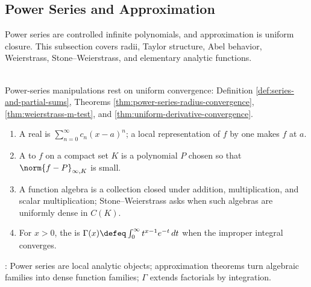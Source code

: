 \subsection{Power Series and Approximation}

%


Power series are controlled infinite polynomials, and approximation is uniform closure. This subsection covers radii, Taylor structure, Abel behavior, Weierstrass, Stone--Weierstrass, and elementary analytic functions.

\begin{motivation} \label{mot:power-series-as-controlled-infinite-polynomials} \\
Power-series manipulations rest on uniform convergence: Definition \ref{def:series-and-partial-sums}, Theorems \ref{thm:power-series-radius-convergence}, \ref{thm:weierstrass-m-test}, and \ref{thm:uniform-derivative-convergence}.
\end{motivation}

\begin{definition} \label{def:power-approx-fourier-core-source-todo}\label{def:power-approx-core-objects} 
\begin{enumerate}[label=(\roman*)]
\setlength{\itemsep}{0pt}
\item A real  is $\sum\limits_{n=0}^{\infty}c_n(x-a)^n$; a local representation of $f$ by one makes $f$  at $a$.
\item A  to $f$ on a compact set $K$ is a polynomial $P$ chosen so that $\norm{f-P}_{\infty,K}$ is small.
\item A function algebra is a collection closed under addition, multiplication, and scalar multiplication; Stone--Weierstrass asks when such algebras are uniformly dense in $C(K)$.
\item For $x>0$, the  is $\Gamma(x)\defeq\int_0^\infty t^{x-1}e^{-t}\,dt$ when the improper integral converges.
\end{enumerate}
: Power series are local analytic objects; approximation theorems turn algebraic families into dense function families; $\Gamma$ extends factorials by integration.
\end{definition}

